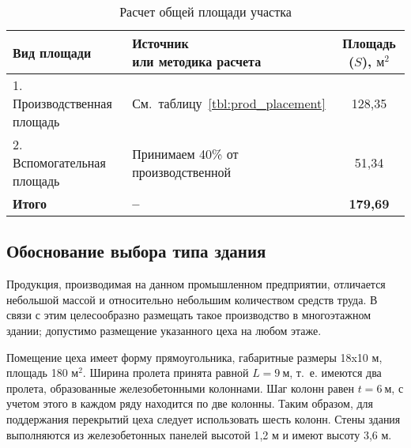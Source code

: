 \begin{table} [h!]
  \caption{
    Расчет общей площади участка
  }\label{tbl:common_placement}
    \begin{tabular}{| m{5.8cm} | m{5.75cm} | c |}
      \hline
      \parbox{5.8cm}{
        \smallskip
        \centering Вид  площади
        \smallskip
      }
      & \parbox{5.75cm}{
          \smallskip
          \centering Источник \\ или методика расчета
          \smallskip
      }
      & Площадь (\( S \)), \( \text{м}^2 \) \\
      \hline

      1. Производственная \newline площадь 
      & \centering См.~таблицу~\ref{tbl:prod_placement}
      & 128{,}35 \\
      \hline

      2. Вспомогательная \newline площадь 
      & \centering Принимаем 40\% \newline от производственной
      & 51{,}34 \\
      \hline
      
      \raggedleft \textbf{Итого} & \centering \textbf{--} & \textbf{179{,}69} \\
      \hline
    \end{tabular}
\end{table}

\subsection{Обоснование выбора типа здания}

Продукция, производимая на данном промышленном предприятии,
отличается небольшой массой и относительно небольшим количеством средств труда.
В связи с этим целесообразно размещать такое производство в многоэтажном здании;
допустимо размещение указанного цеха на любом этаже.

Помещение цеха имеет форму прямоугольника, габаритные размеры 18x10 м, 
площадь 180 \( \text{м}^2 \).
Ширина пролета принята равной \( L = 9 \: \text{м} \),
т.~е. имеются два пролета, образованные железобетонными колоннами. 
Шаг колонн равен \( t = 6 \: \text{м} \), с учетом этого в каждом ряду находится
по две колонны.
Таким образом, для поддержания перекрытий цеха следует использовать шесть колонн.
Стены здания выполняются из железобетонных панелей высотой 1{,}2 м и
имеют высоту 3{,}6 м.
